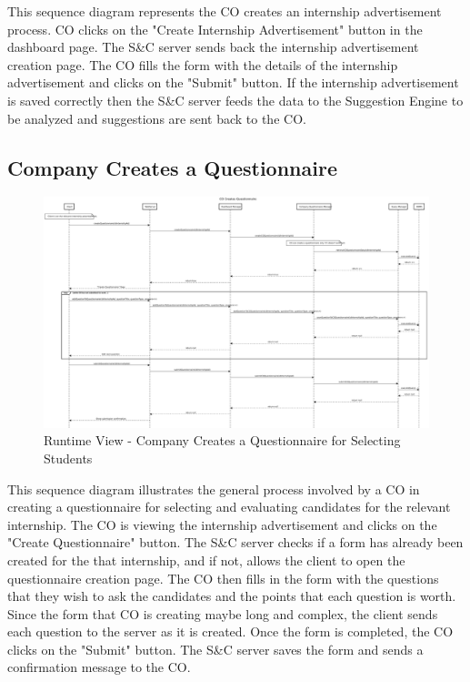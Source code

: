 \par This sequence diagram represents the CO creates an internship advertisement process. CO clicks on the "Create Internship
Advertisement" button in the dashboard page. The S\&C server sends back the internship advertisement creation page. The CO fills
the form with the details of the internship advertisement and clicks on the "Submit" button. If the internship advertisement is
saved correctly then the S\&C server feeds the data to the Suggestion Engine to be analyzed and suggestions are sent back to the CO.


\subsection{Company Creates a Questionnaire}
\label{sub:company-creates-a-questionnaire}%

\begin{figure}[H]
      \centering
      \includegraphics[width=1.0\textwidth]{Images/RV_07.pdf}
      \caption{Runtime View - Company Creates a Questionnaire for Selecting Students}
      \label{fig:rv-co-creates-questionnaire}
\end{figure}

\par This sequence diagram illustrates the general process involved by a CO in creating a questionnaire for selecting
and evaluating candidates for the relevant internship. The CO is viewing the internship advertisement and clicks on the
"Create Questionnaire" button. The S\&C server checks if a form has already been created for the that internship, and
if not, allows the client to open the questionnaire creation page. The CO then fills in the form with the questions
that they wish to ask the candidates and the points that each question is worth. Since the form that CO is creating
maybe long and complex, the client sends each question to the server as it is created. Once the form is completed, the
CO clicks on the "Submit" button. The S\&C server saves the form and sends a confirmation message to the CO.

